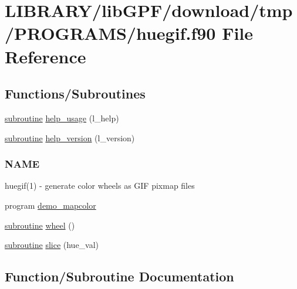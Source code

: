 \hypertarget{huegif_8f90}{}\section{L\+I\+B\+R\+A\+R\+Y/lib\+G\+P\+F/download/tmp/\+P\+R\+O\+G\+R\+A\+M\+S/huegif.f90 File Reference}
\label{huegif_8f90}
\subsection*{Functions/\+Subroutines}
\begin{DoxyCompactItemize}
\item 
\hyperlink{M__stopwatch_83_8txt_acfbcff50169d691ff02d4a123ed70482}{subroutine} \hyperlink{huegif_8f90_a3e09a3b52ee8fb04eeb93fe5761626a8}{help\+\_\+usage} (l\+\_\+help)
\item 
\hyperlink{M__stopwatch_83_8txt_acfbcff50169d691ff02d4a123ed70482}{subroutine} \hyperlink{huegif_8f90_a39c21619b08a3c22f19e2306efd7f766}{help\+\_\+version} (l\+\_\+version)
\begin{DoxyCompactList}\small\item\em \subsubsection*{N\+A\+ME}

huegif(1) -\/ generate color wheels as G\+IF pixmap files \end{DoxyCompactList}\item 
program \hyperlink{huegif_8f90_a4cb33e3f49cb1fde8386c9e2b79874fe}{demo\+\_\+mapcolor}
\item 
\hyperlink{M__stopwatch_83_8txt_acfbcff50169d691ff02d4a123ed70482}{subroutine} \hyperlink{huegif_8f90_afc37db6c42d2e7bb12cb85b98d9eba9b}{wheel} ()
\item 
\hyperlink{M__stopwatch_83_8txt_acfbcff50169d691ff02d4a123ed70482}{subroutine} \hyperlink{huegif_8f90_a303c71c69a7b51abd347bd12cea7014f}{slice} (hue\+\_\+val)
\end{DoxyCompactItemize}


\subsection{Function/\+Subroutine Documentation}
\mbox{\label{huegif_8f90_a4cb33e3f49cb1fde8386c9e2b79874fe}} 
